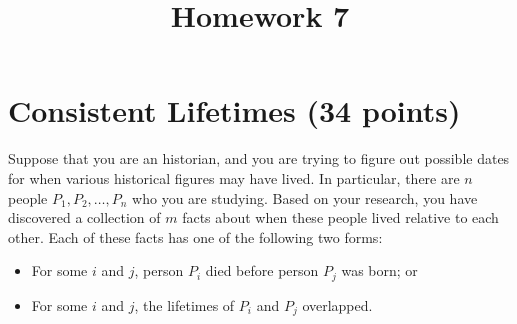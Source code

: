 \documentclass{article}
\begin{document}
\title{Homework 7}
\maketitle
\thispagestyle{fancy}


\section{Consistent Lifetimes (34 points)}

Suppose that you are an historian, and you are trying to figure out possible dates for when various historical figures may have lived.  In particular, there are $n$ people $P_1, P_2, \dots, P_n$ who you are studying.  Based on your research, you have discovered a collection of $m$ facts about when these people lived relative to each other.  Each of these facts has one of the following two forms:
\begin{itemize}
	\item For some $i$ and $j$, person $P_i$ died before person $P_j$ was born; or
	\item For some $i$ and $j$, the lifetimes of $P_i$ and $P_j$ overlapped.
\end{itemize}
\end{document}
